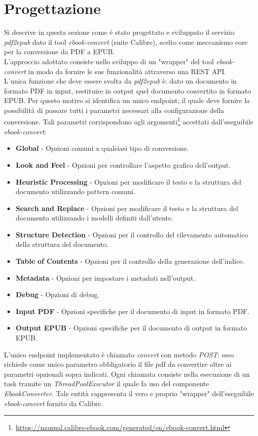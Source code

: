 \section{Progettazione}
Si descrive in questa sezione come è stato progettato e sviluppato il servizio \textit{pdf2epub} dato il tool \textit{ebook-convert} (suite Calibre), scelto come meccanismo core per la conversione da PDF a EPUB.\\
L'approccio adottato consiste nello sviluppo di un "wrapper" del tool \textit{ebook-convert} in modo da fornire le sue funzionalità attraverso una REST API.\\
L'unica funzione che deve essere svolta da \textit{pdf2epub} è: dato un documento in formato PDF in input, restituire in output quel documento convertito in formato EPUB. Per questo motivo si identifica un unico endpoint, il quale deve fornire la possibilità di passare tutti i parametri necessari alla configurazione della conversione. Tali parametri corrispondono agli argomenti\footnote{\url{https://manual.calibre-ebook.com/generated/en/ebook-convert.html}} accettati dall'eseguibile \textit{ebook-convert}:
\begin{itemize}
    \item \textbf{Global} - Opzioni comuni a qualsiasi tipo di conversione.
    \item \textbf{Look and Feel} - Opzioni per controllare l'aspetto grafico dell'output.
    \item \textbf{Heuristic Processing} - Opzioni per modificare il testo e la struttura del documento utilizzando pattern comuni.
    \item \textbf{Search and Replace} - Opzioni per modificare il testo e la struttura del documento utilizzando i modelli definiti dall'utente.
    \item \textbf{Structure Detection} - Opzioni per il controllo del rilevamento automatico della struttura del documento.
    \item \textbf{Table of Contents} - Opzioni per il controllo della generazione dell'indice.
    \item \textbf{Metadata} - Opzioni per impostare i metadati nell'output.
    \item \textbf{Debug} - Opzioni di debug.
    \item \textbf{Input PDF} - Opzioni specifiche per il documento di input in formato PDF.
    \item \textbf{Output EPUB} - Opzioni specifiche per il documento di output in formato EPUB.
\end{itemize}
L'unico endpoint implementato è chiamato \textit{convert} con metodo \textit{POST}: esso richiede come unico parametro obbligatorio il file pdf da convertire oltre ai parametri opzionali sopra indicati. Ogni chiamata consiste nella esecuzione di un task tramite un \textit{ThreadPoolExecutor} il quale fa uso del componente \textit{EbookConverter}. Tale entità rappresenta il vero e proprio "wrapper" dell'eseguibile \textit{ebook-convert} fornito da Calibre.

